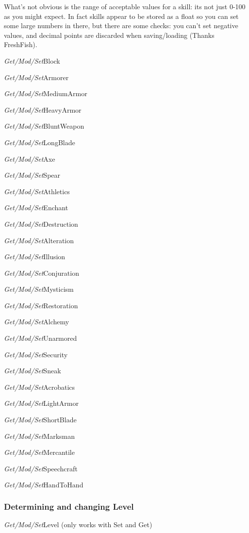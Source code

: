 What's not obvious is the range of acceptable values for a skill: its
not just 0-100 as you might expect. In fact skills appear to be stored
as a float so you can set some large numbers in there, but there are
some checks: you can't set negative values, and decimal points are
discarded when saving/loading (Thanks FreshFish).

\emph{Get/Mod/Set}Block

\emph{Get/Mod/Set}Armorer

\emph{Get/Mod/Set}MediumArmor

\emph{Get/Mod/Set}HeavyArmor

\emph{Get/Mod/Set}BluntWeapon

\emph{Get/Mod/Set}LongBlade

\emph{Get/Mod/Set}Axe

\emph{Get/Mod/Set}Spear

\emph{Get/Mod/Set}Athletics

\emph{Get/Mod/Set}Enchant

\emph{Get/Mod/Set}Destruction

\emph{Get/Mod/Set}Alteration

\emph{Get/Mod/Set}Illusion

\emph{Get/Mod/Set}Conjuration

\emph{Get/Mod/Set}Mysticism

\emph{Get/Mod/Set}Restoration

\emph{Get/Mod/Set}Alchemy

\emph{Get/Mod/Set}Unarmored

\emph{Get/Mod/Set}Security

\emph{Get/Mod/Set}Sneak

\emph{Get/Mod/Set}Acrobatics

\emph{Get/Mod/Set}LightArmor

\emph{Get/Mod/Set}ShortBlade

\emph{Get/Mod/Set}Marksman

\emph{Get/Mod/Set}Mercantile

\emph{Get/Mod/Set}Speechcraft

\emph{Get/Mod/Set}HandToHand

\hypertarget{determining-and-changing-level}{%
\subsubsection{Determining and changing
Level}\label{determining-and-changing-level}}

\emph{Get/Mod/Set}Level (only works with Set and Get)

